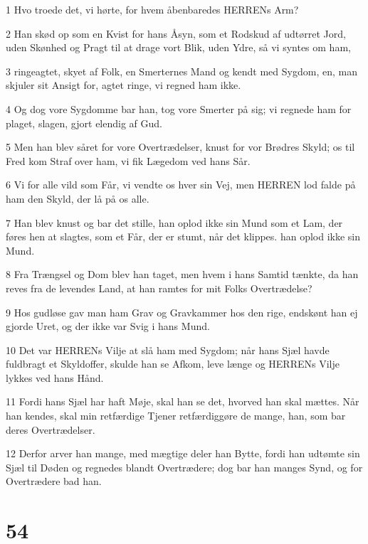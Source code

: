 \par 1 Hvo troede det, vi hørte, for hvem åbenbaredes HERRENs Arm?
\par 2 Han skød op som en Kvist for hans Åsyn, som et Rodskud af udtørret Jord, uden Skønhed og Pragt til at drage vort Blik, uden Ydre, så vi syntes om ham,
\par 3 ringeagtet, skyet af Folk, en Smerternes Mand og kendt med Sygdom, en, man skjuler sit Ansigt for, agtet ringe, vi regned ham ikke.
\par 4 Og dog vore Sygdomme bar han, tog vore Smerter på sig; vi regnede ham for plaget, slagen, gjort elendig af Gud.
\par 5 Men han blev såret for vore Overtrædelser, knust for vor Brødres Skyld; os til Fred kom Straf over ham, vi fik Lægedom ved hans Sår.
\par 6 Vi for alle vild som Får, vi vendte os hver sin Vej, men HERREN lod falde på ham den Skyld, der lå på os alle.
\par 7 Han blev knust og bar det stille, han oplod ikke sin Mund som et Lam, der føres hen at slagtes, som et Får, der er stumt, når det klippes. han oplod ikke sin Mund.
\par 8 Fra Trængsel og Dom blev han taget, men hvem i hans Samtid tænkte, da han reves fra de levendes Land, at han ramtes for mit Folks Overtrædelse?
\par 9 Hos gudløse gav man ham Grav og Gravkammer hos den rige, endskønt han ej gjorde Uret, og der ikke var Svig i hans Mund.
\par 10 Det var HERRENs Vilje at slå ham med Sygdom; når hans Sjæl havde fuldbragt et Skyldoffer, skulde han se Afkom, leve længe og HERRENs Vilje lykkes ved hans Hånd.
\par 11 Fordi hans Sjæl har haft Møje, skal han se det, hvorved han skal mættes. Når han kendes, skal min retfærdige Tjener retfærdiggøre de mange, han, som bar deres Overtrædelser.
\par 12 Derfor arver han mange, med mægtige deler han Bytte, fordi han udtømte sin Sjæl til Døden og regnedes blandt Overtrædere; dog bar han manges Synd, og for Overtrædere bad han.

\chapter{54}

